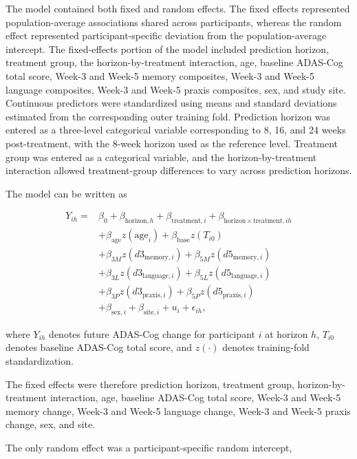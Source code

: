 \documentclass[11pt]{article}
\begin{document}
The model contained both fixed and random effects. The fixed effects represented
population-average associations shared across participants, whereas the random effect
represented participant-specific deviation from the population-average intercept. The fixed-effects portion of the model included prediction horizon, treatment group,
the horizon-by-treatment interaction, age, baseline ADAS-Cog total score, Week-3 and
Week-5 memory composites, Week-3 and Week-5 language composites, Week-3 and Week-5
praxis composites, sex, and study site. Continuous predictors were standardized using
means and standard deviations estimated from the corresponding outer training fold. Prediction horizon was entered as a three-level categorical variable corresponding
to 8, 16, and 24 weeks post-treatment, with the 8-week horizon used as the reference
level. Treatment group was entered as a categorical variable, and the
horizon-by-treatment interaction allowed treatment-group differences to vary across
prediction horizons.

The model can be written as

\begin{align}
Y_{ih}
={}&
\beta_0
+
\beta_{\mathrm{horizon},h}
+
\beta_{\mathrm{treatment},i}
+
\beta_{\mathrm{horizon}\times\mathrm{treatment},ih}
\nonumber\\
&+
\beta_{\mathrm{age}}z(\mathrm{age}_i)
+
\beta_{\mathrm{base}}z(T_{i0})
\nonumber\\
&+
\beta_{3M}z(d3_{\mathrm{memory},i})
+
\beta_{5M}z(d5_{\mathrm{memory},i})
\nonumber\\
&+
\beta_{3L}z(d3_{\mathrm{language},i})
+
\beta_{5L}z(d5_{\mathrm{language},i})
\nonumber\\
&+
\beta_{3P}z(d3_{\mathrm{praxis},i})
+
\beta_{5P}z(d5_{\mathrm{praxis},i})
\nonumber\\
&+
\beta_{\mathrm{sex},i}
+
\beta_{\mathrm{site},i}
+
u_i
+
\epsilon_{ih},
\end{align}

where $Y_{ih}$ denotes future ADAS-Cog change for participant $i$ at horizon $h$,
$T_{i0}$ denotes baseline ADAS-Cog total score, and $z(\cdot)$ denotes
training-fold standardization.

The fixed effects were therefore prediction horizon, treatment group,
horizon-by-treatment interaction, age, baseline ADAS-Cog total score,
Week-3 and Week-5 memory change, Week-3 and Week-5 language change,
Week-3 and Week-5 praxis change, sex, and site.

The only random effect was a participant-specific random intercept,
\end{document}
